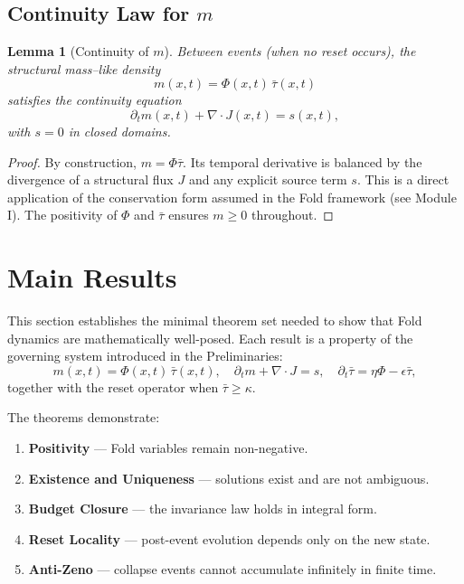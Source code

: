 \documentclass[11pt]{article}
\newtheorem{lemma}[theorem]{Lemma}
\begin{document}
\subsection{Continuity Law for $m$}

\begin{lemma}[Continuity of $m$]
Between events (when no reset occurs), the structural mass--like density
\[
m(x,t) = \Phi(x,t)\,\bar{\tau}(x,t)
\]
satisfies the continuity equation
\[
\partial_t m(x,t) + \nabla \cdot J(x,t) = s(x,t),
\]
with $s=0$ in closed domains.
\end{lemma}

\begin{proof}
By construction, $m = \Phi \bar{\tau}$. Its temporal derivative is balanced by the divergence of a structural flux $J$ and any explicit source term $s$. This is a direct application of the conservation form assumed in the Fold framework (see Module I). The positivity of $\Phi$ and $\bar{\tau}$ ensures $m \geq 0$ throughout. \qedhere
\end{proof}


\section{Main Results}

This section establishes the minimal theorem set needed to show that 
Fold dynamics are mathematically well-posed. Each result is a property 
of the governing system introduced in the Preliminaries:
\[
m(x,t) = \Phi(x,t)\,\bar{\tau}(x,t), \quad
\partial_t m + \nabla \cdot J = s, \quad
\partial_t \bar{\tau} = \eta \Phi - \epsilon \bar{\tau},
\]
together with the reset operator when $\bar{\tau} \geq \kappa$. 

The theorems demonstrate:
\begin{enumerate}[leftmargin=*]
    \item \textbf{Positivity} — Fold variables remain non-negative.
    \item \textbf{Existence and Uniqueness} — solutions exist and are not ambiguous.
    \item \textbf{Budget Closure} — the invariance law holds in integral form.
    \item \textbf{Reset Locality} — post-event evolution depends only on the new state.
    \item \textbf{Anti-Zeno} — collapse events cannot accumulate infinitely in finite time.
\end{enumerate}
\end{document}
